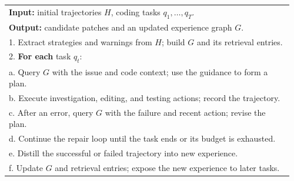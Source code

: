 \begin{algorithm}[!htbp]
\caption{ContextGraph across a stream of coding tasks}
\label{alg:contextgraph}
\small
\begin{tabular}{@{}p{0.96\linewidth}@{}}
\textbf{Input:} initial trajectories $H$, coding tasks $q_1,\ldots,q_T$.\\
\textbf{Output:} candidate patches and an updated experience graph $G$.\\
1. Extract strategies and warnings from $H$; build $G$ and its retrieval entries.\\
2. \textbf{For each} task $q_t$:\\
\quad a. Query $G$ with the issue and code context; use the guidance to form a plan.\\
\quad b. Execute investigation, editing, and testing actions; record the trajectory.\\
\quad c. After an error, query $G$ with the failure and recent action; revise the plan.\\
\quad d. Continue the repair loop until the task ends or its budget is exhausted.\\
\quad e. Distill the successful or failed trajectory into new experience.\\
\quad f. Update $G$ and retrieval entries; expose the new experience to later tasks.\\
\end{tabular}
\end{algorithm}
